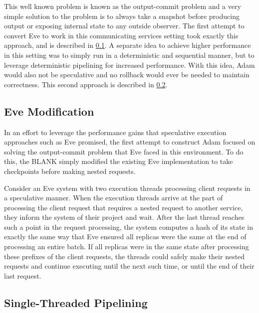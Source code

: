 \documentclass[11pt, oneside]{report}
\begin{document}
This well known problem is known as the output-commit problem and a very simple solution to the problem is to always take a snapshot before producing output or exposing internal state to any outside observer. 
The first attempt to convert Eve to work in this communicating services setting took exactly this approach, and is described in \ref{EveModification}. 
A separate idea to achieve higher performance in this setting was to simply run in a deterministic and sequential manner, but to leverage deterministic pipelining for increased performance. 
With this idea, Adam would also not be speculative and no rollback would ever be needed to maintain correctness. This second approach is described in \ref{STP}.

\subsection{Eve Modification}\label{EveModification}

In an effort to leverage the performance gains that speculative execution approaches such as Eve promised, the first attempt to construct Adam focused on solving the output-commit problem that Eve faced in this environment. 
To do this, the 
BLANK %
simply modified the existing Eve implementation to take checkpoints before making nested requests. 



Consider an Eve system with two execution threads processing client requests in a speculative manner. 
When the execution threads arrive at the part of processing the client request that requires a nested request to another service, they inform the system of their project and wait. 
After the last thread reaches such a point in the request processing, the system computes a hash of its state in exactly the same way that Eve ensured all replicas were the same at the end of processing an entire batch. 
If all replicas were in the same state after processing these prefixes of the client requests, the threads could safely make their nested requests and continue executing until the next such time, or until the end of their last request.

\subsection{Single-Threaded Pipelining}\label{STP}
\end{document}

